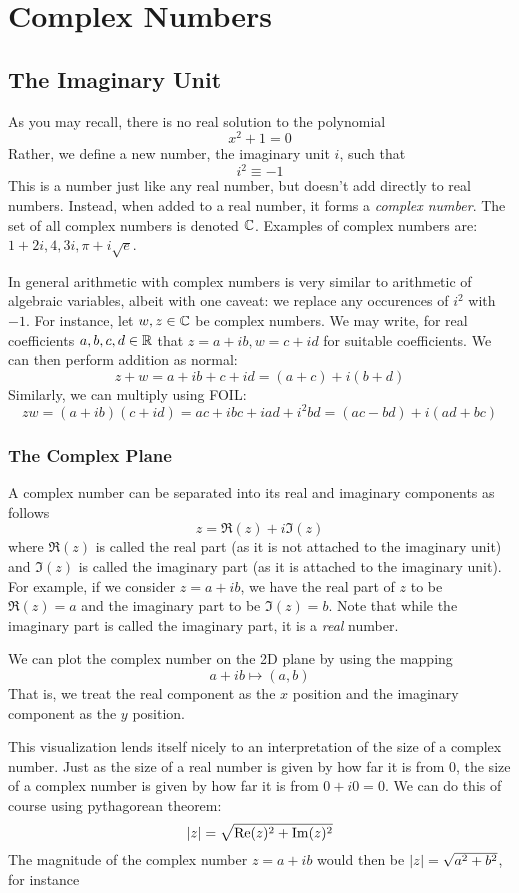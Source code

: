 \chapter{Complex Numbers}
\section{The Imaginary Unit}
As you may recall, there is no real solution to the polynomial 
\[x^2+1=0\]
Rather, we define a new number, the imaginary unit \(i\), such that
\[i^2\equiv-1\]
This is a number just like any real number, but doesn't add directly to real numbers. Instead, when added to a real number, it forms a \emph{complex number}. The set of all complex numbers is denoted \(\mathbb{C}\). Examples of complex numbers are: \(1+2i, 4, 3i, \pi+i\sqrt{e}\).

In general arithmetic with complex numbers is very similar to arithmetic of algebraic variables, albeit with one caveat: we replace any occurences of \(i^2\) with \(-1\). For instance, let \(w,z\in\mathbb{C}\) be complex numbers. We may write, for real coefficients \(a,b,c,d\in\mathbb{R}\) that \(z=a+ib, w= c+id\) for suitable coefficients. We can then perform addition as normal:
\[z+w = a+ib + c+id = (a+c) + i(b+d)\]
Similarly, we can multiply using FOIL:\@
\[zw = (a+ib)(c+id) = ac + ibc + iad + i^2bd = (ac-bd) +i(ad+bc)\]

\subsection{The Complex Plane}
A complex number can be separated into its real and imaginary components as follows
\begin{equation}
	z = \Re(z) + i\Im(z)
\end{equation}
where \(\Re(z)\) is called the real part (as it is not attached to the imaginary unit) and \(\Im(z)\) is called the imaginary part (as it is attached to the imaginary unit). For example, if we consider \(z = a+ib\), we have the real part of \(z\) to be \(\Re(z)=a\) and the imaginary part to be \(\Im(z) = b\). Note that while the imaginary part is called the imaginary part, it is a \emph{real} number. 

We can plot the complex number on the 2D plane by using the mapping
\[a+ib \mapsto (a,b)\]
That is, we treat the real component as the \(x\) position and the imaginary component as the \(y\) position.

This visualization lends itself nicely to an interpretation of the size of a complex number. Just as the size of a real number is given by how far it is from 0, the size of a complex number is given by how far it is from \(0+i0 = 0\). We can do this of course using pythagorean theorem:
\begin{equation}
	\left|z\right| = \sqrt{\operatorname{Re}(z)^2+\operatorname{Im}(z)^2}
\end{equation}
The magnitude of the complex number \(z=a+ib\) would then be \(\left|z\right| = \sqrt{a^2+b^2}\), for instance

